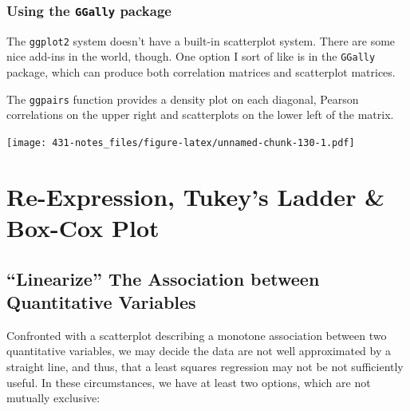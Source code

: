 \documentclass[
]{book}
\newenvironment{Shaded}{\begin{snugshade}}{\end{snugshade}}
\newcommand{\DataTypeTok}[1]{\textcolor[rgb]{0.13,0.29,0.53}{#1}}
\newcommand{\KeywordTok}[1]{\textcolor[rgb]{0.13,0.29,0.53}{\textbf{#1}}}
\newcommand{\NormalTok}[1]{#1}
\newcommand{\OperatorTok}[1]{\textcolor[rgb]{0.81,0.36,0.00}{\textbf{#1}}}
\newcommand{\StringTok}[1]{\textcolor[rgb]{0.31,0.60,0.02}{#1}}
\begin{document}
\hypertarget{using-the-ggally-package}{%
\subsection{\texorpdfstring{Using the \texttt{GGally} package}{Using the GGally package}}\label{using-the-ggally-package}}

The \texttt{ggplot2} system doesn't have a built-in scatterplot system. There are some nice add-ins in the world, though. One option I sort of like is in the \texttt{GGally} package, which can produce both correlation matrices and scatterplot matrices.

The \texttt{ggpairs} function provides a density plot on each diagonal, Pearson correlations on the upper right and scatterplots on the lower left of the matrix.

\begin{Shaded}
\end{Shaded}

\texttt{[image: 431-notes\_files/figure-latex/unnamed-chunk-130-1.pdf]}

\hypertarget{re-expression-tukeys-ladder-box-cox-plot}{%
\chapter{Re-Expression, Tukey's Ladder \& Box-Cox Plot}\label{re-expression-tukeys-ladder-box-cox-plot}}

\hypertarget{linearize-the-association-between-quantitative-variables}{%
\section{``Linearize'' The Association between Quantitative Variables}\label{linearize-the-association-between-quantitative-variables}}

Confronted with a scatterplot describing a monotone association between two quantitative variables, we may decide the data are not well approximated by a straight line, and thus, that a least squares regression may not be not sufficiently useful. In these circumstances, we have at least two options, which are not mutually exclusive:
\end{document}
